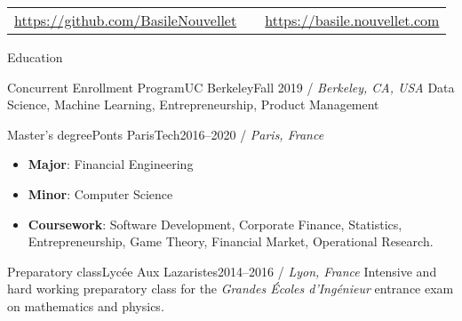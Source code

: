 \documentclass[]{mcdowellcv}
\begin{document}
    \makeheader

    \begin{tabu}
        to 1\textwidth { X[2,l,p] X[c,p] X[2,r,p] }
        {\small \url{https://github.com/BasileNouvellet}} & \textbf{} & {\small \url{https://basile.nouvellet.com}} \\
    \end{tabu}

    \begin{cvsection}{Education}
    	
        \begin{cvsubsection}{Concurrent Enrollment Program}{UC Berkeley}{Fall 2019 / \textit{Berkeley, CA, USA}}
            Data Science, Machine Learning, Entrepreneurship, Product Management
        \end{cvsubsection}

        \begin{cvsubsection}{Master's degree}{Ponts ParisTech}{2016--2020 / \textit{Paris, France}}
            \begin{itemize}
                \item \textbf{Major}: Financial Engineering
                \item \textbf{Minor}: Computer Science
                \item \textbf{Coursework}: Software Development, Corporate Finance, Statistics, Entrepreneurship, Game Theory, Financial Market, Operational Research.
            \end{itemize}
        \end{cvsubsection}

        \begin{cvsubsection}{Preparatory class}{Lyc\'ee Aux Lazaristes}{2014--2016 / \textit{Lyon, France}}
            Intensive and hard working preparatory class for the \textit{Grandes \'Ecoles d'Ing\'enieur} entrance exam on mathematics and physics.
        \end{cvsubsection}

    \end{cvsection}
\end{document}
